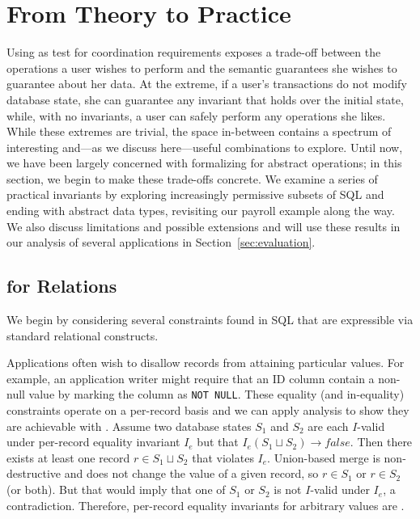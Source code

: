 
\section{From Theory to Practice}
\label{sec:bcc-practice}
\label{sec:merge}

Using \iconfluence as test for coordination requirements exposes a
trade-off between the operations a user wishes to perform and the
semantic guarantees she wishes to guarantee about her data. At the
extreme, if a user's transactions do not modify database state, she
can guarantee any invariant that holds over the initial state, while,
with no invariants, a user can safely perform any operations she
likes. While these extremes are trivial, the space in-between contains
a spectrum of interesting and---as we discuss here---useful
combinations to explore. Until now, we have been largely concerned
with formalizing \iconfluence for abstract operations; in this
section, we begin to make these trade-offs concrete. We examine a
series of practical invariants by exploring increasingly permissive
subsets of SQL and ending with abstract data types, revisiting our
payroll example along the way. We also discuss limitations and
possible extensions and will use these results in our analysis of
several applications in Section~\ref{sec:evaluation}.

\subsection{\iconfluence for Relations}

We begin by considering several constraints found in SQL that are
expressible via standard relational constructs.

 Applications often wish to disallow records from
attaining particular values. For example, an application writer might
require that an ID column contain a non-null value by marking the
column as \texttt{NOT NULL}. These equality (and in-equality)
constraints operate on a per-record basis and we can apply
\iconfluence analysis to show they are achievable with
\cfreedom. Assume two database states $S_1$ and $S_2$ are each
$I$-valid under per-record equality invariant $I_e$ but that $I_e(S_1
\sqcup S_2)\rightarrow false$. Then there exists at least one record
$r \in S_1 \sqcup S_2$ that violates $I_e$. Union-based merge is
non-destructive and does not change the value of a given record, so $r
\in S_1$ or $r \in S_2$ (or both). But that would imply that one of
$S_1$ or $S_2$ is not $I$-valid under $I_e$, a
contradiction. Therefore, per-record equality invariants for arbitrary
values are \iconfluent.

